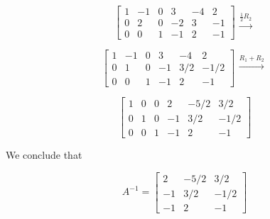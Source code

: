 \documentclass{ximera}
\begin{document}
\begin{example}
\begin{explanation}
 $$\left[\begin{array}{ccc|ccc}  
 1&-1&0&3&-4&2\\0&2&0&-2&3&-1\\0&0&1&-1&2&-1
 \end{array}\right]
  \begin{array}{c}
 \\
 \xrightarrow{\frac{1}{2}R_2}\\
\\
 \end{array}$$
 
 $$\left[\begin{array}{ccc|ccc}  
 1&-1&0&3&-4&2\\0&1&0&-1&3/2&-1/2\\0&0&1&-1&2&-1
 \end{array}\right]
 \begin{array}{c}
 \xrightarrow{R_1+R_2}\\
 \\
\\
 \end{array}$$
 
 $$\left[\begin{array}{ccc|ccc}  
 1&0&0&2&-5/2&3/2\\0&1&0&-1&3/2&-1/2\\0&0&1&-1&2&-1
 \end{array}\right]$$
 
 We conclude that
 
$$A^{-1}=\begin{bmatrix}2&-5/2&3/2\\-1&3/2&-1/2\\-1&2&-1\end{bmatrix}$$
\end{explanation}

\end{example}
\end{document}
